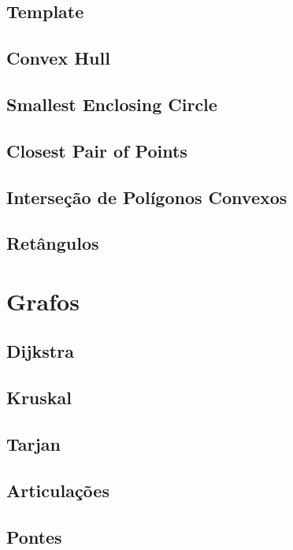 \documentclass[10pt, letterpaper, twocolumn, twosides]{article}
\begin{document}
\subsection{Template}

\subsection{Convex Hull}

\subsection{Smallest Enclosing Circle}

\subsection{Closest Pair of Points}

\subsection{Interseção de Polígonos Convexos}

\subsection{Retângulos}


\section{Grafos}
\subsection{Dijkstra}

\subsection{Kruskal}

\subsection{Tarjan}

\subsection{Articulações}

\subsection{Pontes}

\end{document}
